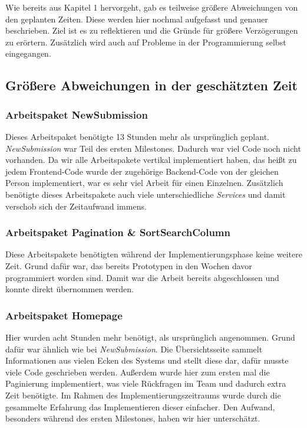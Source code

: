 
Wie bereits aus Kapitel 1 hervorgeht, gab es teilweise größere Abweichungen von den geplanten Zeiten. Diese werden hier nochmal aufgefasst und genauer beschrieben. Ziel ist es zu reflektieren und die Gründe für größere Verzögerungen zu erörtern. Zusätzlich wird auch auf Probleme in der Programmierung selbst eingegangen.

\subsection{Größere Abweichungen in der geschätzten Zeit}

\subsubsection{Arbeitspaket NewSubmission}

Dieses Arbeitspaket benötigte 13 Stunden mehr als ursprünglich geplant.
\emph{NewSubmission} war Teil des ersten Milestones. Dadurch war viel Code noch nicht vorhanden. Da wir alle Arbeitspakete vertikal implementiert haben, das heißt zu jedem Frontend-Code wurde der zugehörige Backend-Code von der gleichen Person implementiert, war es sehr viel Arbeit für einen Einzelnen. Zusätzlich benötigte dieses Arbeitspakete auch viele unterschiedliche \emph{Services} und damit verschob sich der Zeitaufwand immens.

\subsubsection{Arbeitspaket Pagination \& SortSearchColumn}

Diese Arbeitspakete benötigten während der Implementierungsphase keine weitere Zeit. Grund dafür war, das bereits Prototypen in den Wochen davor programmiert worden sind. Damit war die Arbeit bereits abgeschlossen und konnte direkt übernommen werden.

\subsubsection{Arbeitspaket Homepage}

Hier wurden acht Stunden mehr benötigt, als ursprünglich angenommen. Grund dafür war ähnlich wie bei \emph{NewSubmission}. Die Übersichtsseite sammelt Informationen aus vielen Ecken des Systems und stellt diese dar, dafür musste viele Code geschrieben werden. Außerdem wurde hier zum ersten mal die Paginierung implementiert, was viele Rückfragen im Team und dadurch extra Zeit benötigte. Im Rahmen des Implementierungszeitraums wurde durch die gesammelte Erfahrung das Implementieren dieser einfacher. Den Aufwand, besonders während des ersten Milestones, haben wir hier unterschätzt.

